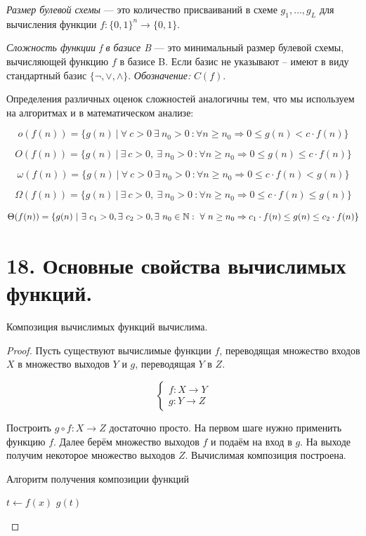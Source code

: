 \textit{Размер булевой схемы} --- это количество присваиваний в схеме 
$g_1, \ldots, g_L$ для вычисления функции $f: \{0, 1\}^n \rightarrow \{0, 1\}$. 

\textit{Сложность функции f в базисе B} --- это минимальный размер булевой схемы, 
вычисляющей функцию $f$ в базисе B. Если базис не указывают -- имеют в виду 
стандартный базис $\{\lnot, \lor, \land\}$. \textit{Обозначение:} $C(f)$.

Определения различных оценок сложностей аналогичны тем, что мы используем на алгоритмах и в математическом анализе:

\[
o(f(n)) = \{g(n) \ | \ \forall \ c > 0 \ \exists \ n_0 > 0 \ : \forall n \geq n_0 \Rightarrow 0 \leq g(n) < c \cdot f(n)\}
\]

\[
O(f(n)) = \{g(n) \ | \ \exists \ c > 0, \ \exists \ n_0 > 0 \ : \forall n \geq n_0 \Rightarrow 0 \leq g(n) \leq c \cdot f(n)\}
\]

\[
\omega(f(n)) = \{g(n) \ | \ \forall \ c > 0 \ \exists \ n_0 > 0 \ : \forall n \geq n_0 \Rightarrow 0 \leq c \cdot f(n) < g(n)\}
\]

\[
\Omega(f(n)) = \{g(n) \ | \ \exists \ c > 0, \ \exists \ n_0 > 0 \ : \forall n \geq n_0 \Rightarrow 0 \leq c \cdot f(n) \leq g(n)\}
\]

\[
\Theta(f(n)) = \{g(n) \ | \ \exists \ c_1 > 0, \exists \ c_2 > 0, \exists \ n_0 \in \N: \ \forall \ n \geq n_0 \Rightarrow c_1 \cdot f(n) \leq g(n) \leq c_2 \cdot f(n)\}
\]

\section*{18. Основные свойства вычислимых функций.}


\begin{algo1}
	Композиция вычислимых функций вычислима.
\end{algo1}
\begin{proof}
	Пусть существуют вычислимые функции $f$, переводящая множество входов $X$ в множество выходов $Y$ и $g$, переводящая $Y$ в $Z$.
	
	\[
	\begin{cases}
	f: X \to Y \\
	g: Y \to Z
	\end{cases}
	\]
	
	Построить $g \circ f: X \to Z$ достаточно просто. На первом шаге нужно применить функцию $f$. Далее берём множество выходов $f$ и подаём на вход в $g$. На выходе получим некоторое множество выходов $Z$. Вычислимая композиция построена.
	
	\begin{algorithm}
		\caption{Алгоритм получения композиции функций}
		\begin{algorithmic}[1]
			\State $t \gets f(x)$
			\State \Return $g(t)$
			\EndFunction
		\end{algorithmic}
	\end{algorithm}
\end{proof}

